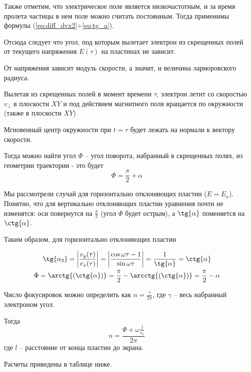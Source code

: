Также отметим, что электрическое поле является низкочастотным, и за время пролета частицы в нем поле можно считать постоянным. Тогда применимы формулы (\ref{eq:diff_dvx2}$\div$\ref{eq:tg_a}).

Отсюда следует что угол, под которым вылетает электрон из скрещенных полей от текущего напряжения $E(\tau)$ на пластинах не зависит. 

От напряжения зависит модуль скорости, а значит, и величина ларморовского радиуса. 

Вылетая из скрещенных полей в момент времени $\tau$, электрон летит со скоростью $v_\perp$ в плоскости $XY$ и под действием магнитного поля вращается по окружности (также в плоскости $XY$)

Мгновенный центр окружности при $t=\tau$ будет лежать на нормали к вектору скорости.

Тогда можно найти угол $\Phi$ -- угол поворота, набранный в скрещенных полях, из геометрии траектории - это будет $$\Phi=\frac{\pi}{2}+\alpha$$

Мы рассмотрели случай для горизонтально отклоняющих пластин ($E=E_x$). Понятно, что для вертикально отклоняющих пластин уравнения почти не изменятся: оси повернутся на $\frac{\pi}{2}$ (угол $\Phi$ будет острым), а $\tg{\alpha}$ поменяется на $\ctg{\alpha}$.

Таким образом, для горизонтально отклоняющих пластин 

\begin{gather}
	\tg{\alpha_2}=\left|\frac{v_y(\tau)}{v_x(\tau)}\right|=\left|\frac{\cos\omega{\tau}-1}{\sin{\omega{\tau}}}\right|=\frac{1}{\tg{\alpha}}=\ctg{\alpha}\\
	\Phi=\arctg{(\ctg{\alpha})}=\frac{\pi}{2}-\arcctg{(\ctg{\alpha})}=\frac{\pi}{2}-\alpha
\end{gather}

Число фокусировок можно определить как $n=\frac{\gamma}{2\pi}$, где $\gamma$ -- весь набранный электроном угол.

Тогда
\begin{equation}
	n=\frac{\Phi+\omega\frac{l}{v_z}}{2\pi}
\end{equation}
где $l$ -- расстояние от конца пластин до экрана.

Расчеты приведены в таблице ниже.

